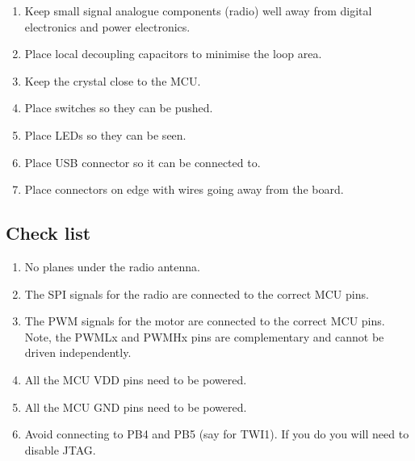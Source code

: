 \begin{enumerate}
\item
  Keep small signal analogue components (radio) well away from digital
  electronics and power electronics.
\item
  Place local decoupling capacitors to minimise the loop area.
\item
  Keep the crystal close to the MCU.
\item
  Place switches so they can be pushed.
\item
  Place LEDs so they can be seen.
\item
  Place USB connector so it can be connected to.
\item
  Place connectors on edge with wires going away from the board.
\end{enumerate}

\subsection{Check list}\label{check-list}

\begin{enumerate}
\item
  No planes under the radio antenna.
\item
  The SPI signals for the radio are connected to the correct MCU pins.
\item
  The PWM signals for the motor are connected to the correct MCU pins.
  Note, the PWMLx and PWMHx pins are complementary and cannot be driven
  independently.
\item
  All the MCU VDD pins need to be powered.
\item
  All the MCU GND pins need to be powered.
\item
  Avoid connecting to PB4 and PB5 (say for TWI1).  If you do you will need to disable JTAG.
\end{enumerate}

